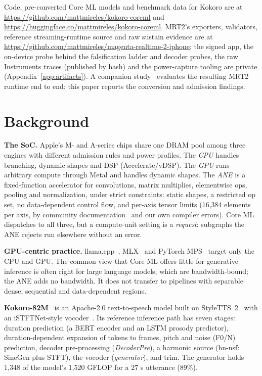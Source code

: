 \documentclass[11pt]{article}
\begin{document}
Code, pre-converted Core ML models and benchmark data for Kokoro are at \url{https://github.com/mattmireles/kokoro-coreml} and \url{https://huggingface.co/mattmireles/kokoro-coreml}. MRT2's exporters, validators, reference streaming-runtime source and raw sustain evidence are at \url{https://github.com/mattmireles/magenta-realtime-2-iphone}; the signed app, the on-device probe behind the falsification ladder and decoder probes, the raw Instruments traces (published by hash) and the power-capture tooling are private (Appendix~\ref{app:artifacts}). A companion study~\citep{mrt2-three-clocks} evaluates the resulting MRT2 runtime end to end; this paper reports the conversion and admission findings.

\section{Background}\label{sec:background}

\textbf{The SoC.} Apple's M- and A-series chips share one DRAM pool among three engines with different admission rules and power profiles. The \emph{CPU} handles branching, dynamic shapes and DSP (Accelerate/vDSP). The \emph{GPU} runs arbitrary compute through Metal and handles dynamic shapes. The \emph{ANE} is a fixed-function accelerator for convolutions, matrix multiplies, elementwise ops, pooling and normalization, under strict constraints: static shapes, a restricted op set, no data-dependent control flow, and per-axis tensor limits (16,384 elements per axis, by community documentation~\citep{ane-field-guide,orion} and our own compiler errors). Core ML~\citep{coremltools} dispatches to all three, but a compute-unit setting is a \emph{request}: subgraphs the ANE rejects run elsewhere without an error.

\textbf{GPU-centric practice.} llama.cpp~\citep{llamacpp}, MLX~\citep{mlx} and PyTorch MPS~\citep{pytorch-mps-metal,pytorch-mps-notes} target only the CPU and GPU. The common view that Core ML offers little for generative inference is often right for large language models, which are bandwidth-bound; the ANE adds no bandwidth. It does not transfer to pipelines with separable dense, sequential and data-dependent regions.

\textbf{Kokoro-82M}~\citep{kokoro-model,kokoro-lib} is an Apache-2.0 text-to-speech model built on StyleTTS~2~\citep{styletts2} with an iSTFTNet-style vocoder~\citep{istftnet}. Its reference inference path has seven stages: duration prediction (a BERT encoder and an LSTM prosody predictor), duration-dependent expansion of tokens to frames, pitch and noise (F0/N) prediction, decoder pre-processing (\emph{DecoderPre}), a harmonic source (hn-nsf: SineGen plus STFT), the vocoder (\emph{generator}), and trim. The generator holds 1,348 of the model's 1,520 GFLOP for a 27 s utterance (89\%).
\end{document}
